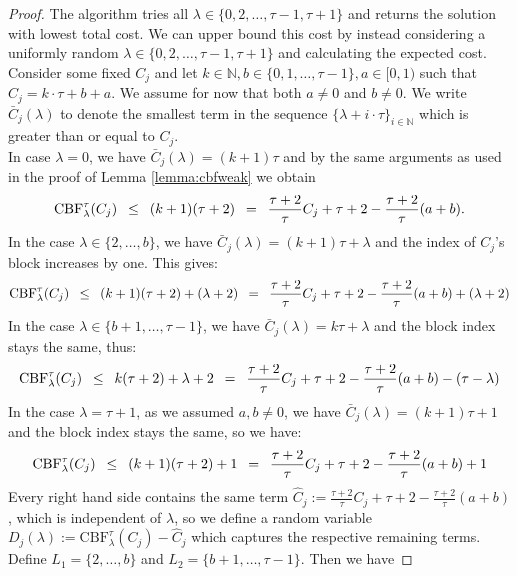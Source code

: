 \documentclass[11pt]{article}
\newcommand{\Hquad}{\hspace{0.5em}}
\begin{document}
\rsthmcbf*
\begin{proof}
The algorithm tries all $\lambda \in \{0,2,\dotsc,\tau-1,\tau+1\}$ and returns the solution with lowest total cost. We can upper bound this cost by instead considering a uniformly random $\lambda \in \{0,2,\dotsc,\tau-1,\tau+1\}$ and calculating the expected cost.
Consider some fixed $C_j$ and let $k \in \mathbb{N}, b \in \{0,1,\dotsc,\tau-1\}, a \in [0,1)$ such that $C_j = k\cdot \tau + b + a$. We assume for now that both $a\neq 0$ and $b \neq 0$. We write $\bar{C}_j(\lambda)$ to denote the smallest term in the sequence $\{\lambda+i\cdot\tau\}_{i \in \mathbb{N}}$ which is greater than or equal to $C_j$. \\
In case $\lambda = 0$, we have $\bar{C}_j(\lambda) = (k+1)\tau$ and by the same arguments as used in the proof of Lemma \ref{lemma:cbfweak} we obtain
\begin{equation*}
    \mathrm{CBF}^\tau_\lambda(C_j) \Hquad\le\Hquad (k+1)(\tau+2) \Hquad = \Hquad \frac{\tau+2}{\tau}C_j + \tau + 2 - \frac{\tau+2}{\tau}(a+b). 
\end{equation*}
In the case $\lambda \in \{2,\dotsc,b\}$, we have $\bar{C}_j(\lambda) = (k+1)\tau + \lambda$ and the index of $C_j$'s block increases by one. This gives:
\begin{equation*}
    \mathrm{CBF}^\tau_\lambda(C_j) \Hquad\le\Hquad (k+1)(\tau+2) + (\lambda+2) \Hquad=\Hquad \frac{\tau+2}{\tau}C_j + \tau + 2 - \frac{\tau+2}{\tau}(a+b) + (\lambda + 2) 
\end{equation*}
In the case $\lambda \in \{b+1,\dotsc, \tau-1\}$, we have $\bar{C}_j(\lambda) = k\tau + \lambda$ and the block index stays the same, thus:
\begin{equation*}
    \mathrm{CBF}^\tau_\lambda(C_j) \Hquad\le\Hquad k(\tau+2) + \lambda + 2 \Hquad=\Hquad \frac{\tau+2}{\tau}C_j + \tau + 2 - \frac{\tau+2}{\tau}(a+b) - (\tau -\lambda) 
\end{equation*}
In the case $\lambda = \tau+1$, as we assumed $a,b \neq 0$, we have $\bar{C}_j(\lambda) = (k+1)\tau + 1$ and the block index stays the same, so we have:
\begin{equation*}
    \mathrm{CBF}^\tau_\lambda(C_j) \Hquad\le\Hquad (k+1)(\tau+2) + 1 \Hquad=\Hquad \frac{\tau+2}{\tau}C_j + \tau + 2 - \frac{\tau+2}{\tau}(a+b) + 1
\end{equation*}
Every right hand side contains the same term $\hat{C}_j := \frac{\tau+2}{\tau}C_j + \tau + 2 - \frac{\tau+2}{\tau}(a+b)$, which is independent of $\lambda$, so we define a random variable $D_j(\lambda) := \mathrm{CBF}^\tau_\lambda(C_j) - \hat{C}_j$ which captures the respective remaining terms. Define $L_1 = \{2,\dotsc, b\}$ and $L_2 = \{b+1,\dotsc, \tau-1\}$. Then we have

\end{proof}
\end{document}
